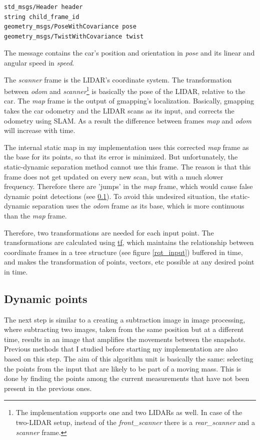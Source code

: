 \begin{minipage}{\textwidth}
\begin{lstlisting}[language=IDL]
std_msgs/Header header
string child_frame_id
geometry_msgs/PoseWithCovariance pose
geometry_msgs/TwistWithCovariance twist
\end{lstlisting}
\end{minipage}

The message contains the car's position and orientation in \textit{pose} and its linear and angular speed in \textit{speed}.

The \textit{scanner} frame is the LIDAR's coordinate system. The transformation between \textit{odom} and \textit{scanner}\footnote{The implementation supports one and two LIDARs as well. In case of the two-LIDAR setup, instead of the \textit{front\_scanner} there is a \textit{rear\_scanner} and a \textit{scanner} frame.} is basically the pose of the LIDAR, relative to the car. The \textit{map} frame is the output of gmapping's localization. Basically, gmapping takes the car odometry and the LIDAR scans as its input, and corrects the odometry using SLAM. As a result the difference between frames \textit{map} and \textit{odom} will increase with time.

The internal static map in my implementation uses this corrected \textit{map} frame as the base for its points, so that its error is minimized. But unfortunately, the static-dynamic separation method cannot use this frame. The reason is that this frame does not get updated on every new scan, but with a much slower frequency. Therefore there are 'jumps' in the \textit{map} frame, which would cause false dynamic point detections (see \ref{chap:dynamic_points}). To avoid this undesired situation, the static-dynamic separation uses the \textit{odom} frame as its base, which is more continuous than the \textit{map} frame.

Therefore, two transformations are needed for each input point. The transformations are calculated using \href{http://wiki.ros.org/tf}{tf}, which maintains the relationship between coordinate frames in a tree structure (see figure \ref{rqt_input}) buffered in time, and makes the transformation of points, vectors, etc possible at any desired point in time.

\subsection{Dynamic points}
\label{chap:dynamic_points}
The next step is similar to a creating a subtraction image in image processing, where subtracting two images, taken from the same position but at a different time, results in an image that amplifies the movements between the snapshots. Previous methods\cite{RealTimeDynamicObjectDetection} that I studied before starting my implementation are also based on this step. The aim of this algorithm unit is basically the same: selecting the points from the input that are likely to be part of a moving mass. This is done by finding the points among the current measurements that have not been present in the previous ones.

